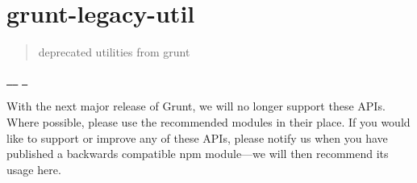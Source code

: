 \chapter{grunt-\/legacy-\/util}
\hypertarget{md__c_1_2_users_2_s_t_r_i_d_e_r_2source_2repos_2_internal_a_p_i_2_internal_a_p_i_2wwwroot_2lib_2c46d7c2446dbe7cc84e8847dd6924f54}{}\label{md__c_1_2_users_2_s_t_r_i_d_e_r_2source_2repos_2_internal_a_p_i_2_internal_a_p_i_2wwwroot_2lib_2c46d7c2446dbe7cc84e8847dd6924f54}
\label{md__c_1_2_users_2_s_t_r_i_d_e_r_2source_2repos_2_internal_a_p_i_2_internal_a_p_i_2wwwroot_2lib_2c46d7c2446dbe7cc84e8847dd6924f54_autotoc_md9166}%
%
\begin{quote}
deprecated utilities from grunt \end{quote}
\href{https://travis-ci.org/gruntjs/grunt-legacy-util}{\texttt{ }} \href{https://ci.appveyor.com/project/gruntjs/grunt-legacy-util/branch/master}{\texttt{ }} \href{http://gruntjs.com/}{\texttt{ }}

With the next major release of Grunt, we will no longer support these APIs. Where possible, please use the recommended modules in their place. If you would like to support or improve any of these APIs, please notify us when you have published a backwards compatible npm module---we will then recommend its usage here.

